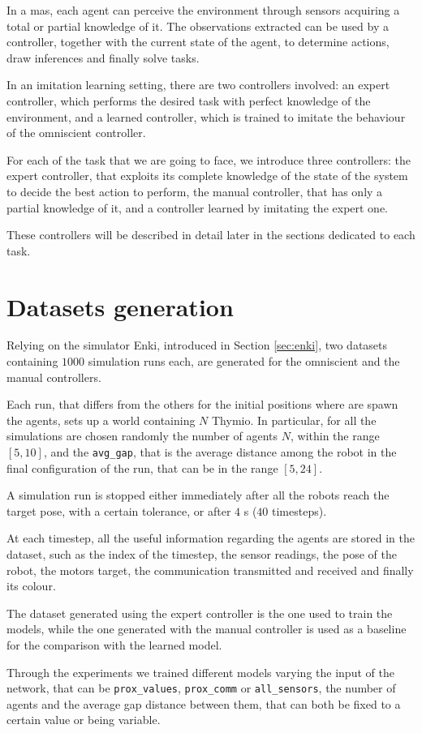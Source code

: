 In a \gls{mas}, each agent can perceive the environment through sensors 
acquiring a total or partial knowledge of it. The observations extracted can be 
used by a controller, together with the current state of the agent, to determine 
actions, draw inferences and finally solve tasks. 

In an imitation learning setting, there are two controllers involved: an expert 
controller, which performs the desired task with perfect knowledge of the 
environment, and a learned controller, which is trained to imitate the behaviour 
of the omniscient controller.

For each of the task that we are going to face, we introduce three controllers: the 
expert controller, that exploits its complete knowledge of the state of the system 
to decide the best action to perform, the manual controller, that has only a partial 
knowledge of it, and a controller learned by imitating the expert one.

These controllers will be described in detail later in the sections dedicated to each 
task.

\section{Datasets generation}
\label{sec:dataset}

Relying on the simulator Enki, introduced in Section \ref{sec:enki}, two datasets 
containing $1000$ simulation runs each, are generated for the omniscient and 
the manual controllers. 

Each run, that differs from the others for the initial positions where are spawn the 
agents, sets up a world containing $N$ Thymio. 
In particular, for all the simulations are chosen randomly the number of agents 
$N$, within the range $[5, 10]$, and the \texttt{avg\_gap}, that is the average 
distance among the robot in the final configuration of the run, that can be in the 
range $[5, 24]$.

A simulation run is stopped either immediately after all the robots reach the 
target pose, with a certain tolerance, or after $4$ \gls{s} ($40$ timesteps).

At each timestep, all the useful information regarding the agents are stored in the 
dataset, such as the index of the timestep, the sensor readings, the pose of the 
robot, the motors target, the communication transmitted and received and finally 
its colour.

The dataset generated using the expert controller is the one used to train the 
models, while the one generated with the manual controller is used as a baseline 
for the comparison with the learned model.

Through the experiments we trained different models varying the input of the 
network, that can be \texttt{prox\_values}, \texttt{prox\_comm} or 
\texttt{all\_sensors}, the number of agents and the average gap distance between 
them, that can both be fixed to a certain value or being variable.



